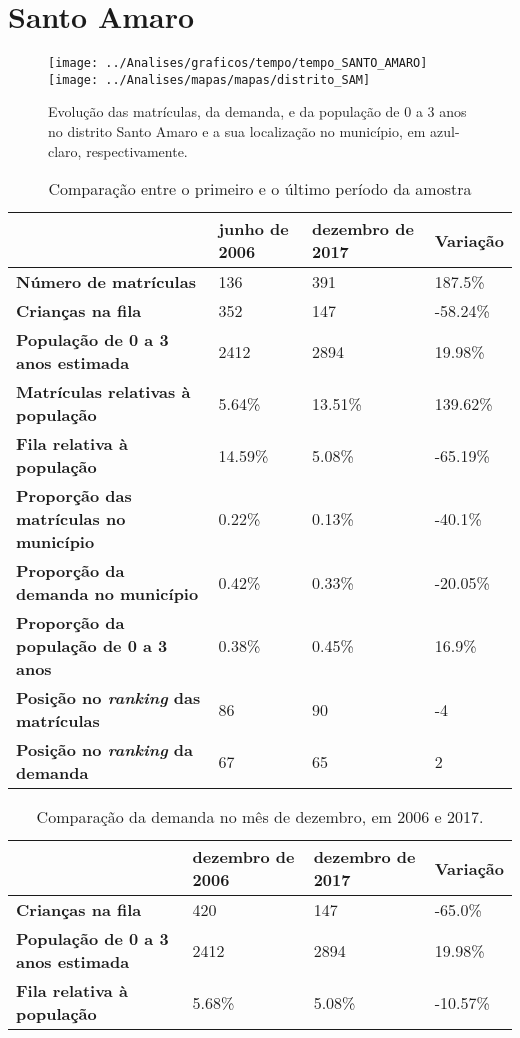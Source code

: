 \section{Santo Amaro}
\begin{figure}[H]
\centering
\texttt{[image: ../Analises/graficos/tempo/tempo\_SANTO\_AMARO]}
\texttt{[image: ../Analises/mapas/mapas/distrito\_SAM]}
\caption{Evolução das matrículas, da demanda, e da população de 0 a 3 anos no distrito Santo Amaro e a sua localização no município, em azul-claro, respectivamente.}
\end{figure}
\begin{table}[H]
\begin{tabular}{l|l|l|l}
\textbf{}                                      & \textbf{junho de 2006}       & \textbf{dezembro de 2017}    & \textbf{Variação} \\ \hline
\textbf{Número de matrículas}                  & 136 & 391 & 187.5\% \\ \hline
\textbf{Crianças na fila}                      & 352 & 147 & -58.24\% \\ \hline
\textbf{População de 0 a 3 anos estimada}      & 2412 & 2894 & 19.98\% \\ \hline
\textbf{Matrículas relativas à população}      & 5.64\% & 13.51\% & 139.62\% \\ \hline
\textbf{Fila relativa à população}             & 14.59\% & 5.08\% & -65.19\% \\ \hline
\textbf{Proporção das matrículas no município} & 0.22\% & 0.13\% & -40.1\% \\ \hline
\textbf{Proporção da demanda no município}     & 0.42\% & 0.33\% & -20.05\% \\ \hline
\textbf{Proporção da população de 0 a 3 anos}  & 0.38\% & 0.45\% & 16.9\% \\ \hline
\textbf{Posição no \textit{ranking} das matrículas}     & 86 & 90 & -4 \\ \hline
\textbf{Posição no \textit{ranking} da demanda}         & 67 & 65 & 2 \\ 
\end{tabular}
\caption{Comparação entre o primeiro e o último período da amostra}
\end{table}
\begin{table}[H]
\begin{tabular}{l|l|l|l}
\textbf{}                                 & \textbf{dezembro de 2006} & \textbf{dezembro de 2017} & \textbf{Variação} \\ \hline
\textbf{Crianças na fila}                      & 420 & 147 & -65.0\% \\ \hline
\textbf{População de 0 a 3 anos estimada}      & 2412 & 2894 & 19.98\% \\ \hline
\textbf{Fila relativa à população}             & 5.68\% & 5.08\% & -10.57\% \\
\end{tabular}
\caption{Comparação da demanda no mês de dezembro, em 2006 e 2017.}
\end{table}
